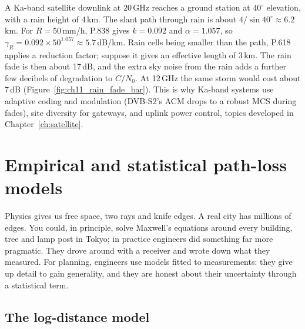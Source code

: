 \begin{worked}
A Ka-band satellite downlink at 20\,GHz reaches a ground station at $40^\circ$ elevation, with a
rain height of 4\,km. The slant path through rain is about $4/\sin40^\circ\approx6.2$\,km. For
$R=50$\,mm/h, P.838 gives $k=0.092$ and $\alpha=1.057$, so $\gamma_R=0.092\times50^{1.057}
\approx5.7$\,dB/km. Rain cells being smaller than the path, P.618 applies a reduction factor;
suppose it gives an effective length of 3\,km. The rain fade is then about 17\,dB, and the extra
sky noise from the rain adds a further few decibels of degradation to $C/N_0$. At 12\,GHz the same
storm would cost about 7\,dB (Figure~\ref{fig:ch11_rain_fade_bar}). This is why Ka-band systems use
adaptive coding and modulation (DVB-S2's ACM drops to a robust MCS during fades), site diversity
for gateways, and uplink power control, topics developed in Chapter~\ref{ch:satellite}.
\end{worked}


\section{Empirical and statistical path-loss models}
\label{sec:ch11:models}

Physics gives us free space, two rays and knife edges. A real city has millions of edges. You
could, in principle, solve Maxwell's equations around every building, tree and lamp post in
Tokyo; in practice engineers did something far more pragmatic. They drove around with a
receiver and wrote down what they measured. For planning, engineers use models fitted to
measurements: they give up detail to gain generality, and they are honest about their
uncertainty through a statistical term.

\subsection{The log-distance model}

